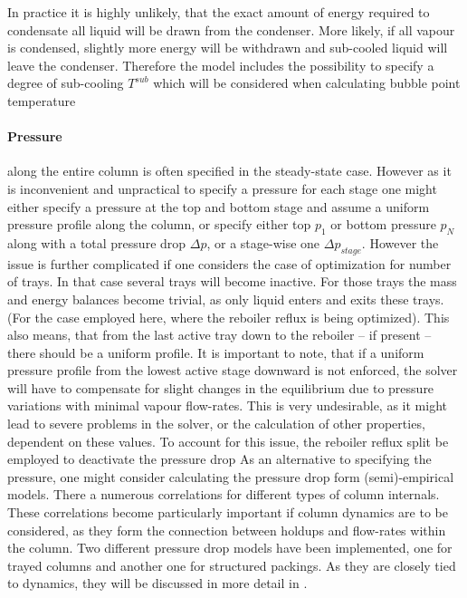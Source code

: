         In practice it is highly unlikely, that the exact amount of energy required to condensate all
        liquid will be drawn from the condenser. More likely, if all vapour is condensed, slightly more
        energy will be withdrawn and sub-cooled liquid will leave the condenser. Therefore
        the model includes the possibility to specify a degree of sub-cooling $T^{sub}$ which will be
        considered when calculating bubble point temperature
        \paragraph{Pressure} along the entire column is often specified in the steady-state case.
        However as it is inconvenient and unpractical to specify a pressure for each stage one might either specify
        a pressure at the top and bottom stage and assume a uniform pressure profile along the column, or
        specify either top $p_1$ or bottom pressure $p_N$ along with a total pressure drop $\Delta p$,
        or a stage-wise one $\Delta p_{stage}$. However the issue is further complicated if one considers the
        case of optimization for number of trays. In that case several trays will become inactive. For those
        trays the mass and energy balances become trivial, as only liquid enters and exits these trays.
        (For the case employed here, where the reboiler reflux is being optimized). This also means,
        that from the last active tray down to the reboiler -- if present -- there should be a uniform
        profile. It is important to note, that if a uniform pressure profile from the lowest active stage
        downward is not enforced, the solver will have to compensate for slight changes in the equilibrium
        due to pressure variations with minimal vapour flow-rates. This is very undesirable, as it might
        lead to severe problems in the solver, or the calculation of other properties, dependent on these values.
        To account for this issue, the reboiler reflux split be employed to deactivate the pressure drop
        As an alternative to specifying the pressure, one might consider calculating the pressure drop
        form (semi)-empirical models. There a numerous correlations for different types of column internals.
        These correlations become particularly important if column dynamics are to be considered, as they
        form the connection between holdups and flow-rates within the column. Two different pressure drop models
        have been implemented, one for trayed columns and another one for structured packings. As they are closely
        tied to dynamics, they will be discussed in more detail in .


